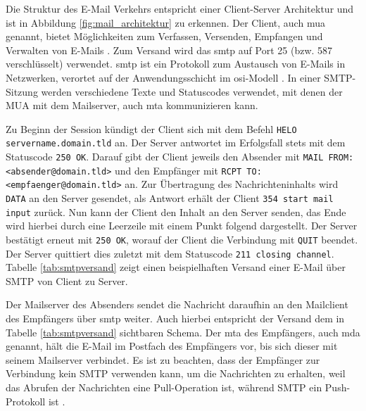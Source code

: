 \noindent Die Struktur des E-Mail Verkehrs entspricht einer Client-Server Architektur und ist in Abbildung \ref{fig:mail_architektur} zu erkennen. Der Client, auch \acrfull{mua} genannt, bietet Möglichkeiten zum Verfassen, Versenden, Empfangen und Verwalten von E-Mails \citep[S. 142 f.]{Kurose2014}. Zum Versand wird das \acrfull{smtp} auf Port 25 (bzw. 587 verschlüsselt) verwendet. \acrshort{smtp} ist ein Protokoll zum Austausch von E-Mails in Netzwerken, verortet auf der Anwendungsschicht im \acrshort{osi}-Modell \citep[S. 4 ff.]{RFC5321}. In einer SMTP-Sitzung werden verschiedene Texte und Statuscodes verwendet, mit denen der MUA mit dem Mailserver, auch \acrfull{mta} kommunizieren kann. 

Zu Beginn der Session kündigt der Client sich mit dem Befehl \texttt{HELO} \texttt{servername.domain.tld} an. Der Server antwortet im Erfolgsfall stets mit dem Statuscode \texttt{250 OK}. Darauf gibt der Client jeweils den Absender mit \texttt{MAIL FROM:<absender@domain.tld>} und den Empfänger mit \texttt{RCPT TO:<empfaenger@domain.tld>} an. Zur Übertragung des Nachrichteninhalts wird \texttt{DATA} an den Server gesendet, als Antwort erhält der Client \texttt{354 start mail input} zurück. Nun kann der Client den Inhalt an den Server senden, das Ende wird hierbei durch eine Leerzeile mit einem Punkt folgend dargestellt. Der Server bestätigt erneut mit \texttt{250 OK}, worauf der Client die Verbindung mit \texttt{QUIT} beendet. Der Server quittiert dies zuletzt mit dem Statuscode \texttt{211 closing channel}. Tabelle \ref{tab:smtpversand} zeigt einen beispielhaften Versand einer E-Mail über SMTP von Client zu Server. \citep[S. 4 ff.]{RFC821}

Der Mailserver des Absenders sendet die Nachricht daraufhin an den Mailclient des Empfängers über \acrshort{smtp} weiter. Auch hierbei entspricht der Versand dem in Tabelle \ref{tab:smtpversand} sichtbaren Schema. Der \acrshort{mta} des Empfängers, auch \acrfull{mda} genannt, hält die E-Mail im Postfach des Empfängers vor, bis sich dieser mit seinem Mailserver verbindet. Es ist zu beachten, dass der Empfänger zur Verbindung \glqq[...] kein SMTP verwenden kann, um die Nachrichten zu erhalten, weil das Abrufen der Nachrichten eine Pull-Operation ist, während SMTP ein Push-Protokoll ist\grqq{} \citep[S. 150]{Kurose2014}.

